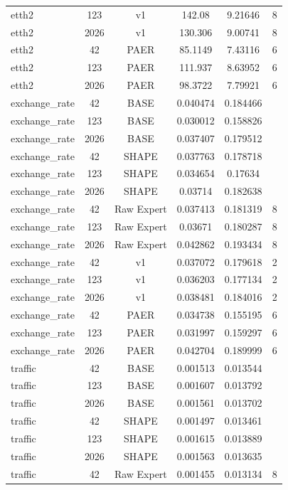 \begin{table}[htbp]
\begin{tabular}{lccccc}
    etth2 & 123 & v1 & 142.08 & 9.21646 & 8 \\
    etth2 & 2026 & v1 & 130.306 & 9.00741 & 8 \\
    etth2 & 42 & PAER & 85.1149 & 7.43116 & 6 \\
    etth2 & 123 & PAER & 111.937 & 8.63952 & 6 \\
    etth2 & 2026 & PAER & 98.3722 & 7.79921 & 6 \\
    exchange\_rate & 42 & BASE & 0.040474 & 0.184466 &  \\
    exchange\_rate & 123 & BASE & 0.030012 & 0.158826 &  \\
    exchange\_rate & 2026 & BASE & 0.037407 & 0.179512 &  \\
    exchange\_rate & 42 & SHAPE & 0.037763 & 0.178718 &  \\
    exchange\_rate & 123 & SHAPE & 0.034654 & 0.17634 &  \\
    exchange\_rate & 2026 & SHAPE & 0.03714 & 0.182638 &  \\
    exchange\_rate & 42 & Raw Expert & 0.037413 & 0.181319 & 8 \\
    exchange\_rate & 123 & Raw Expert & 0.03671 & 0.180287 & 8 \\
    exchange\_rate & 2026 & Raw Expert & 0.042862 & 0.193434 & 8 \\
    exchange\_rate & 42 & v1 & 0.037072 & 0.179618 & 2 \\
    exchange\_rate & 123 & v1 & 0.036203 & 0.177134 & 2 \\
    exchange\_rate & 2026 & v1 & 0.038481 & 0.184016 & 2 \\
    exchange\_rate & 42 & PAER & 0.034738 & 0.155195 & 6 \\
    exchange\_rate & 123 & PAER & 0.031997 & 0.159297 & 6 \\
    exchange\_rate & 2026 & PAER & 0.042704 & 0.189999 & 6 \\
    traffic & 42 & BASE & 0.001513 & 0.013544 &  \\
    traffic & 123 & BASE & 0.001607 & 0.013792 &  \\
    traffic & 2026 & BASE & 0.001561 & 0.013702 &  \\
    traffic & 42 & SHAPE & 0.001497 & 0.013461 &  \\
    traffic & 123 & SHAPE & 0.001615 & 0.013889 &  \\
    traffic & 2026 & SHAPE & 0.001563 & 0.013635 &  \\
    traffic & 42 & Raw Expert & 0.001455 & 0.013134 & 8 \\

\end{tabular}
\end{table}
